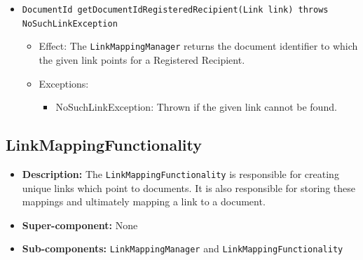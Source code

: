 \documentclass[a4paper,10pt]{article}
\begin{document}
\begin{itemize}
\begin{itemize}
		\item \texttt{DocumentId getDocumentIdRegisteredRecipient(Link link) throws NoSuchLinkException}
		 \begin{itemize}
            \item Effect: The \texttt{LinkMappingManager} returns the document identifier to which the given link points for a Registered Recipient. 
            \item Exceptions: 
            \begin{itemize}
            	\item NoSuchLinkException: Thrown if the given link cannot be found.
            \end{itemize}
		\end{itemize}			
		
	\end{itemize}

\end{itemize}

\subsection{LinkMappingFunctionality}
\begin{itemize}
    \item \textbf{Description:} The \texttt{LinkMappingFunctionality} is responsible for creating unique links which point to documents. It is also responsible for storing these mappings and ultimately mapping a link to a document.
    \item \textbf{Super-component:} None
    \item \textbf{Sub-components:} \texttt{LinkMappingManager} and \texttt{LinkMappingFunctionality}
\end{itemize}
\end{document}
